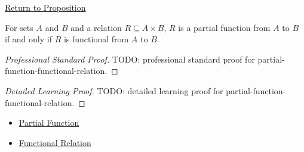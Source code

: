 \newpage
{}
\label{prf:partial-function-functional-relation}

\begin{remark*}[Return]
\hyperref[prop:partial-function-functional-relation]{Return to Proposition}
\end{remark*}

\begin{proposition*}
For sets $A$ and $B$ and a relation $R\subseteq A\times B$, $R$ is a partial
function from $A$ to $B$ if and only if $R$ is functional from $A$ to $B$.
\end{proposition*}

\begin{proof}[Professional Standard Proof]
\LRAProofBodyStart
TODO: professional standard proof for partial-function-functional-relation.
\end{proof}

\begin{proof}[Detailed Learning Proof]
\LRAProofBodyStart
TODO: detailed learning proof for partial-function-functional-relation.
\end{proof}

\begin{remark*}

\end{remark*}

\begin{dependencies}
\begin{itemize}
  \item \hyperref[def:partial-function]{Partial Function}
  \item \hyperref[def:functional-relation]{Functional Relation}
\end{itemize}
\end{dependencies}

\clearpage
